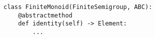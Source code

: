 \begin{verbatim}
class FiniteMonoid(FiniteSemigroup, ABC):
    @abstractmethod
    def identity(self) -> Element:
        ...
\end{verbatim}